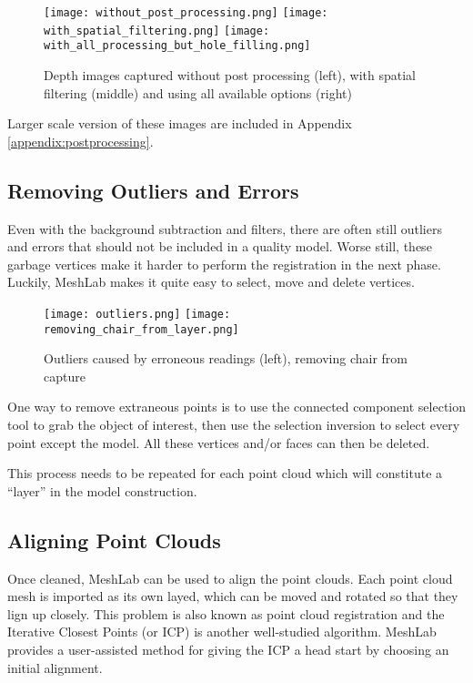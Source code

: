 \begin{figure}[h]
\centering
\texttt{[image: without\_post\_processing.png]}
\texttt{[image: with\_spatial\_filtering.png]}
\texttt{[image: with\_all\_processing\_but\_hole\_filling.png]}
\caption{Depth images captured without post processing (left), with spatial filtering (middle)
and using all available options (right)}
\end{figure}

Larger scale version of these images are included in Appendix \ref{appendix:postprocessing}.

\subsection{Removing Outliers and Errors}

Even with the background subtraction and filters, there are often still
outliers and errors that should not be included in a quality model. Worse still,
these garbage vertices make it harder to perform the registration in the next phase.
Luckily, MeshLab \cite{cignoni2008meshlab} makes it quite easy to select,
move and delete vertices.

\begin{figure}[h]
\centering
\texttt{[image: outliers.png]}
\texttt{[image: removing\_chair\_from\_layer.png]}
\caption{Outliers caused by erroneous readings (left), removing chair from capture}
\end{figure}

One way to remove extraneous points is to use the connected component selection
tool to grab the object of interest, then use the selection inversion to select
every point except the model. All these vertices and/or faces can then be deleted.

This process needs to be repeated for each point cloud which will constitute
a ``layer'' in the model construction.

\subsection{Aligning Point Clouds}

Once cleaned, MeshLab \cite{cignoni2008meshlab} can be used to align the point clouds.
Each point cloud mesh is imported as its own layed, which can be moved and rotated so that
they lign up closely. This problem is also known as point cloud registration \cite{pomerleau2015review} and the Iterative
Closest Points (or ICP) is another well-studied algorithm. MeshLab provides a user-assisted
method for giving the ICP a head start by choosing an initial alignment.

